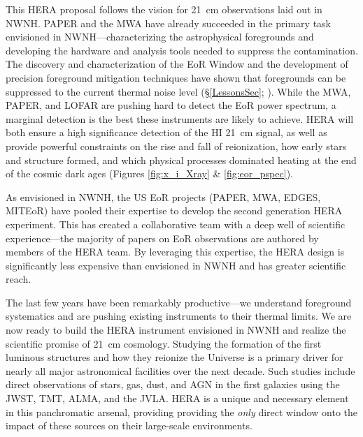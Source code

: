 \documentclass[preprint]{aastex}
\def\HI{{H{\small I }}}
\begin{document}
This HERA proposal follows the vision for 21~cm observations laid out in NWNH.
PAPER and the MWA have already succeeded in the primary task envisioned in
NWNH---characterizing the astrophysical foregrounds and developing the hardware
and analysis 
tools needed to suppress the contamination. The discovery and
characterization of the EoR Window and the development of precision foreground
mitigation techniques have shown that foregrounds can be suppressed to the current
thermal noise level (\S \ref{LessonsSec}; \citealt{parsons_et_al2013}). While the MWA,
PAPER, and LOFAR are pushing hard to detect the EoR power spectrum, %
a marginal detection is the best these instruments are likely to achieve.
HERA will both ensure a high significance detection of the \HI 21~cm 
signal, as
well as provide powerful constraints on the rise and fall of reionization, how
early stars and structure formed, and which physical processes dominated heating at the end of the
cosmic dark ages (Figures \ref{fig:x_i_Xray} \& \ref{fig:eor_pspec}).

As envisioned in NWNH, the US EoR projects (PAPER, MWA, EDGES, MITEoR) have
pooled their expertise to develop the second generation HERA experiment. This
has created a collaborative team with a deep well of scientific
experience---the majority of papers on EoR observations are authored by members
of the HERA team. By leveraging this expertise, the HERA design is significantly
less expensive than envisioned in 
NWNH and has greater scientific reach.

The last few years have been remarkably productive---we
understand foreground systematics and are pushing 
existing
instruments to their thermal limits. We are now ready to build the HERA
instrument envisioned in NWNH and realize the scientific promise of 21~cm
cosmology.
Studying the formation of the first luminous structures 
and how they reionize the Universe is a primary driver for 
nearly all major astronomical facilities over the next decade.
Such studies include direct 
observations of stars, gas, dust, and AGN in the
first galaxies using the JWST, TMT, ALMA, and the JVLA. HERA is 
a unique and necessary element in this panchromatic arsenal, providing
providing the \emph{only} direct window onto the impact of these sources on 
their large-scale environments.


\clearpage
\setcounter{page}{1}
\thispagestyle{empty}
%
%


\end{document}
